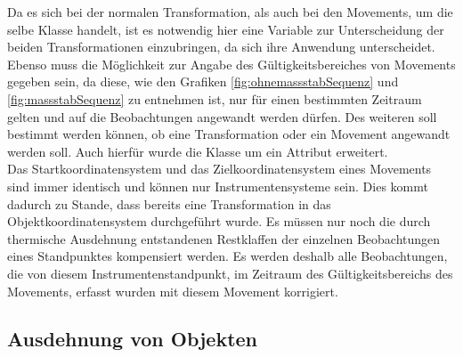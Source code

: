 Da es sich bei der normalen Transformation, als auch bei den Movements, um die selbe Klasse handelt, ist es notwendig hier eine Variable zur Unterscheidung der beiden Transformationen einzubringen, da sich ihre Anwendung unterscheidet.\\
Ebenso muss die Möglichkeit zur Angabe des Gültigkeitsbereiches von Movements gegeben sein, da diese, wie den Grafiken \ref{fig:ohnemassstabSequenz} und \ref{fig:massstabSequenz} zu entnehmen ist, nur für einen bestimmten Zeitraum gelten und auf die Beobachtungen angewandt werden dürfen. Des weiteren soll bestimmt werden können, ob eine Transformation oder ein Movement angewandt werden soll. Auch hierfür wurde die Klasse  um ein Attribut erweitert.\\
Das Startkoordinatensystem und das Zielkoordinatensystem eines Movements sind immer identisch und können nur Instrumentensysteme sein. Dies kommt dadurch zu Stande, dass bereits eine Transformation in das Objektkoordinatensystem durchgeführt wurde. Es müssen nur noch die durch thermische Ausdehnung entstandenen Restklaffen der einzelnen Beobachtungen eines Standpunktes kompensiert werden. Es werden deshalb alle Beobachtungen, die von diesem Instrumentenstandpunkt, im Zeitraum des Gültigkeitsbereichs des Movements, erfasst wurden mit diesem Movement korrigiert.

\subsection{Ausdehnung von Objekten}\label{sec:ausdehnungObjekte}


